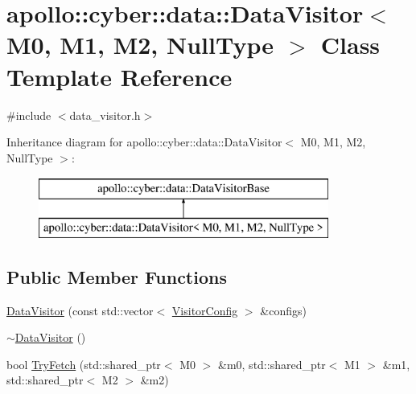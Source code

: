 \hypertarget{classapollo_1_1cyber_1_1data_1_1DataVisitor_3_01M0_00_01M1_00_01M2_00_01NullType_01_4}{\section{apollo\-:\-:cyber\-:\-:data\-:\-:Data\-Visitor$<$ M0, M1, M2, Null\-Type $>$ Class Template Reference}
\label{classapollo_1_1cyber_1_1data_1_1DataVisitor_3_01M0_00_01M1_00_01M2_00_01NullType_01_4}
}


{\ttfamily \#include $<$data\-\_\-visitor.\-h$>$}

Inheritance diagram for apollo\-:\-:cyber\-:\-:data\-:\-:Data\-Visitor$<$ M0, M1, M2, Null\-Type $>$\-:\begin{figure}[H]
\begin{center}
\leavevmode
\includegraphics[height=2.000000cm]{classapollo_1_1cyber_1_1data_1_1DataVisitor_3_01M0_00_01M1_00_01M2_00_01NullType_01_4}
\end{center}
\end{figure}
\subsection*{Public Member Functions}
\begin{DoxyCompactItemize}
\item 
\hyperlink{classapollo_1_1cyber_1_1data_1_1DataVisitor_3_01M0_00_01M1_00_01M2_00_01NullType_01_4_a9095e2ee598089eae64782d078eaf7c5}{Data\-Visitor} (const std\-::vector$<$ \hyperlink{structapollo_1_1cyber_1_1data_1_1VisitorConfig}{Visitor\-Config} $>$ \&configs)
\item 
\hyperlink{classapollo_1_1cyber_1_1data_1_1DataVisitor_3_01M0_00_01M1_00_01M2_00_01NullType_01_4_a6902bea879c6427dcc70e1fdc6883834}{$\sim$\-Data\-Visitor} ()
\item 
bool \hyperlink{classapollo_1_1cyber_1_1data_1_1DataVisitor_3_01M0_00_01M1_00_01M2_00_01NullType_01_4_a252cf8bdc02e71e5845872a0489d0425}{Try\-Fetch} (std\-::shared\-\_\-ptr$<$ M0 $>$ \&m0, std\-::shared\-\_\-ptr$<$ M1 $>$ \&m1, std\-::shared\-\_\-ptr$<$ M2 $>$ \&m2)
\end{DoxyCompactItemize}
